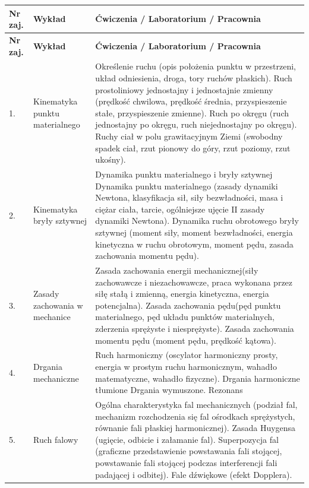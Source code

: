 \documentclass[12pt, a4paper]{article}
\newcommand{\thdrule}{\noalign{\global\setlength{\extrarowheight}{0pt}}}
\newcommand{\thdend}{\noalign{\global\setlength{\extrarowheight}{3pt}}}
\begin{document}
{\scriptsize
\begin{longtable}{m{1.5cm}m{6.5cm}m{6.5cm}}
\thdrule\toprule
\rowcolor{pjatkRed} {\color{white}\textbf{Nr zaj.}} & {\color{white}\textbf{Wykład}} & {\color{white}\textbf{Ćwiczenia / Laboratorium / Pracownia}} \\
\midrule\thdend
\endfirsthead
\thdrule\toprule
\rowcolor{pjatkRed} {\color{white}\textbf{Nr zaj.}} & {\color{white}\textbf{Wykład}} & {\color{white}\textbf{Ćwiczenia / Laboratorium / Pracownia}} \\
\midrule\thdend
\endhead
  \rowcolor{tableRowLight} 1. & Kinematyka punktu materialnego & Określenie ruchu (opis położenia punktu w przestrzeni, układ odniesienia, droga, tory ruchów płaskich). Ruch prostoliniowy jednostajny i jednostajnie zmienny (prędkość chwilowa, prędkość średnia, przyspieszenie stałe, przyspieszenie zmienne). Ruch po okręgu (ruch jednostajny po okręgu, ruch niejednostajny po okręgu). Ruchy ciał w polu grawitacyjnym Ziemi (swobodny spadek ciał, rzut pionowy do góry, rzut poziomy, rzut ukośny). \\
  \rowcolor{tableRowAlt} 2. & Kinematyka bryły sztywnej & Dynamika punktu materialnego i bryły sztywnej Dynamika punktu materialnego (zasady dynamiki Newtona, klasyfikacja sił, siły bezwładności, masa i ciężar ciała, tarcie, ogólniejsze ujęcie II zasady dynamiki Newtona). Dynamika ruchu obrotowego bryły sztywnej (moment siły, moment bezwładności, energia kinetyczna w ruchu obrotowym, moment pędu, zasada zachowania momentu pędu). \\
  \rowcolor{tableRowLight} 3. & Zasady zachowania w mechanice & Zasada zachowania energii mechanicznej(siły zachowawcze i niezachowawcze, praca wykonana przez siłę stałą i zmienną, energia kinetyczna, energia potencjalna). Zasada zachowania pędu(pęd punktu materialnego, pęd układu punktów materialnych, zderzenia sprężyste i niesprężyste). Zasada zachowania momentu pędu (moment pędu, prędkość kątowa). \\
  \rowcolor{tableRowAlt} 4. & Drgania mechaniczne & Ruch harmoniczny (oscylator harmoniczny prosty, energia w prostym ruchu harmonicznym, wahadło matematyczne, wahadło fizyczne). Drgania harmoniczne tłumione Drgania wymuszone. Rezonans \\
  \rowcolor{tableRowLight} 5. & Ruch falowy & Ogólna charakterystyka fal mechanicznych (podział fal, mechanizm rozchodzenia się fal ośrodkach sprężystych, równanie fali płaskiej harmonicznej). Zasada Huygensa (ugięcie, odbicie i załamanie fal). Superpozycja fal (graficzne przedstawienie powstawania fali stojącej, powstawanie fali stojącej podczas interferencji fali padającej i odbitej). Fale dźwiękowe (efekt Dopplera). \\

\end{longtable}}
\end{document}

